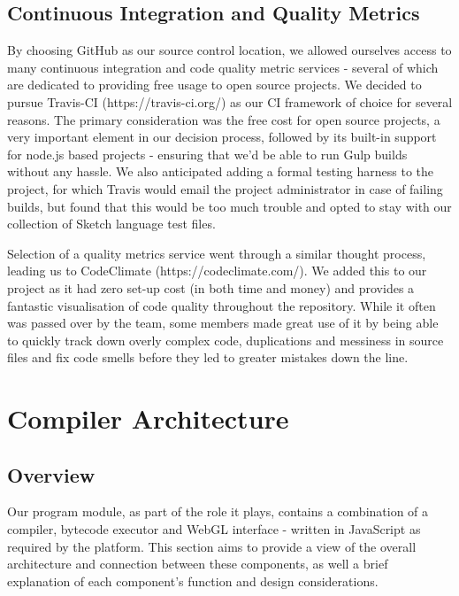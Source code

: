 \documentclass{l3proj}
\begin{document}
\section{Continuous Integration and Quality Metrics}
\label{dev-ci}
By choosing GitHub as our source control location, we allowed ourselves access to many continuous integration and code quality metric services - several of which are dedicated to providing free usage to open source projects. We decided to pursue Travis-CI (https://travis-ci.org/) as our CI framework of choice for several reasons. The primary consideration was the free cost for open source projects, a very important element in our decision process, followed by its built-in support for node.js based projects - ensuring that we'd be able to run Gulp builds without any hassle. We also anticipated adding a formal testing harness to the project, for which Travis would email the project administrator in case of failing builds, but found that this would be too much trouble and opted to stay with our collection of Sketch language test files.

Selection of a quality metrics service went through a similar thought process, leading us to CodeClimate (https://codeclimate.com/). We added this to our project as it had zero set-up cost (in both time and money) and provides a fantastic visualisation of code quality throughout the repository. While it often was passed over by the team, some members made great use of it by being able to quickly track down overly complex code, duplications and messiness in source files and fix code smells before they led to greater mistakes down the line.

\chapter{Compiler Architecture}
\label{arch}

\section{Overview}
\label{arch-over}

Our program module, as part of the role it plays, contains a combination of a compiler, bytecode executor and WebGL interface - written in JavaScript as required by the platform. This section aims to provide a view of the overall architecture and connection between these components, as well a brief explanation of each component's function and design considerations.
\end{document}
